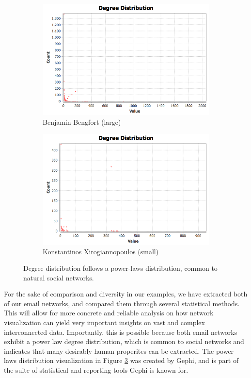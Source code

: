 \documentclass[11pt,letterpaper]{article}
\begin{document}
\begin{figure}[h]
	\centering
	\begin{subfigure}{0.49\textwidth}
		\centering
		\includegraphics[width=\textwidth]{figures/benjamin_degree.png}
		\caption{\textsf{Benjamin Bengfort (large)}}
        \label{fig:benjamin_degree}
	\end{subfigure} \hfill
	\begin{subfigure}{0.49\textwidth}
		\centering
		\includegraphics[width=\textwidth]{figures/kostas_degree.png}
		\caption{\textsf{Konstantinos Xirogiannopoulos (small)}}
        \label{fig:kostas_degree}
	\end{subfigure}
    \caption{\textsf{Degree distribution follows a power-laws distribution, common to natural social networks.}}
    \label{fig:degree}
\end{figure}

For the sake of comparison and diversity in our examples, we have extracted both of our email networks, and compared them through several statistical methods. This will allow for more concrete and reliable analysis on how network visualization can yield very important insights on vast and complex interconnected data. Importantly, this is possible because both email networks exhibit a power law degree distribution, which is common to social networks and indicates that many desirably human properites can be extracted. The power laws distribution visualization in Figure \ref{fig:degree} was created by Gephi, and is part of the suite of statistical and reporting tools Gephi is known for.
\end{document}
